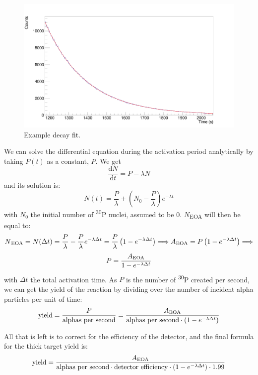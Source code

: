 \documentclass[a4paper,12pt]{report}
\newcommand{\dif}{\text{d}}
\newcommand{\ddt}[1]{\frac{\dif #1}{\dif t}}
\newcommand{\Piso}{\textsuperscript{30}P }
\begin{document}
\begin{figure}[H]
	\centering
	\includegraphics[width=\textwidth]{example_decay_fit.png}
	\caption{Example decay fit.}
	\label{example_decay_fit}
\end{figure}

We can solve the differential equation during the activation period analytically by taking $P(t)$ as a constant, $P$.
We get
\[ \ddt{N} = P -\lambda N  \]
and its solution is:
\begin{equation}
	N(t) = \frac{P}{\lambda} + \left(  N_0 - \frac{P}{\lambda}  \right) e^{-\lambda t}
\end{equation}
with $N_0$ the initial number of \Piso nuclei, assumed to be \num{0}.
$N$\textsubscript{EOA} will then be equal to:
\[ N\textsubscript{EOA} =N(\Delta t) = \frac{P}{\lambda} - \frac{P}{\lambda} e^{-\lambda \Delta t} = \frac{P}{\lambda} \left(1 - e^{-\lambda \Delta t} \right)\Longrightarrow A\textsubscript{EOA}=P\left(1-e^{-\lambda\Delta t}\right)\Longrightarrow \]
\begin{equation}
	P = \frac{A\textsubscript{EOA}}{1 - e^{-\lambda \Delta t}}
\end{equation}
with $\Delta t$ the total activation time.
As $P$ is the number of \Piso created per second, we can get the yield of the reaction by dividing over the number of incident alpha particles per unit of time:
\begin{equation}
	\text{yield} = \frac{P}{\text{alphas per second}} = \frac{A\textsubscript{EOA}}{\text{alphas per second} \cdot \left(1 - e^{-\lambda \Delta t} \right)}
\end{equation}

All that is left is to correct for the efficiency of the detector, and the final formula for the thick target yield is:
\begin{equation}
	\text{yield} = \frac{A\textsubscript{EOA}}{\text{alphas per second} \cdot \text{detector efficiency} \cdot \left(1 - e^{-\lambda \Delta t} \right) \cdot 1.99}	%
\end{equation}
\end{document}
